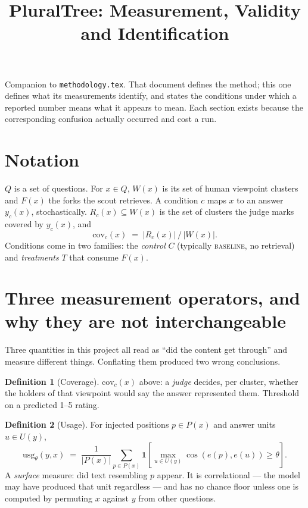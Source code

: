 \documentclass[11pt]{article}
\title{PluralTree: Measurement, Validity and Identification}
\author{}
\date{}
\theoremstyle{definition}
\newtheorem{definition}{Definition}
\newcommand{\cov}{\mathrm{cov}}
\newcommand{\usg}{\mathrm{usg}}
\newcommand{\1}{\mathbf{1}}
\begin{document}
\maketitle

\noindent
Companion to \texttt{methodology.tex}. That document defines the method; this one
defines what its measurements identify, and states the conditions under which a
reported number means what it appears to mean. Each section exists because the
corresponding confusion actually occurred and cost a run.

\section{Notation}

$Q$ is a set of questions. For $x \in Q$, $W(x)$ is its set of human viewpoint
clusters and $F(x)$ the forks the scout retrieves. A condition $c$ maps $x$ to an
answer $y_c(x)$, stochastically. $R_c(x) \subseteq W(x)$ is the set of clusters
the judge marks covered by $y_c(x)$, and
\[
  \cov_c(x) \;=\; |R_c(x)| \,/\, |W(x)|.
\]
Conditions come in two families: the \emph{control} $C$ (typically
\textsc{baseline}, no retrieval) and \emph{treatments} $T$ that consume $F(x)$.

\section{Three measurement operators, and why they are not interchangeable}

Three quantities in this project all read as ``did the content get through'' and
measure different things. Conflating them produced two wrong conclusions.

\begin{definition}[Coverage]
$\cov_c(x)$ above: a \emph{judge} decides, per cluster, whether the holders of
that viewpoint would say the answer represented them. Threshold on a predicted
1--5 rating.
\end{definition}

\begin{definition}[Usage]
For injected positions $p \in P(x)$ and answer units $u \in U(y)$,
\[
  \usg_\theta(y, x) \;=\; \frac{1}{|P(x)|}
  \sum_{p \in P(x)} \1\!\left[\max_{u \in U(y)} \cos(e(p), e(u)) \ge \theta\right].
\]
A \emph{surface} measure: did text resembling $p$ appear. It is correlational ---
the model may have produced that unit regardless --- and has no chance floor
unless one is computed by permuting $x$ against $y$ from other questions.
\end{definition}
\end{document}
